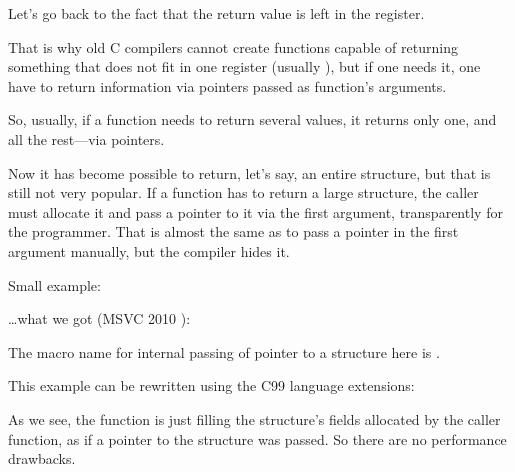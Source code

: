 
Let's go back to the fact that the return value is left in the \EAX register.

That is why old C compilers cannot create functions capable of returning something that does not fit in one 
register (usually \Tint), but if one needs it, one have to return information via pointers passed 
as function's arguments.

So, usually, if a function needs to return several values, it returns only one, and 
all the rest---via pointers.

Now it has become possible to return, let's say, an entire structure, but that is still not very popular. 
If a function has to return a large structure, the \gls{caller} must allocate it and pass a pointer to it via the first argument, transparently for the programmer. 
That is almost the same as to pass a pointer in the first argument manually, but the compiler hides it.

Small example:



\dots what we got (MSVC 2010 \Ox):



The macro name for internal passing of pointer to a structure here is .

This example can be rewritten using
the C99 language extensions:





As we see, the function is just filling the structure's fields allocated by
the caller function,
as if a pointer to the structure was passed.
So there are no performance drawbacks.
